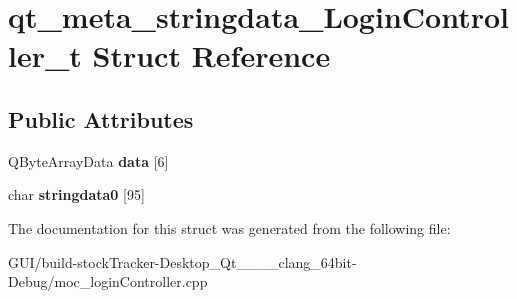 \hypertarget{structqt__meta__stringdata___login_controller__t}{}\section{qt\+\_\+meta\+\_\+stringdata\+\_\+\+Login\+Controller\+\_\+t Struct Reference}
\label{structqt__meta__stringdata___login_controller__t}
\subsection*{Public Attributes}
\begin{DoxyCompactItemize}
\item 
\mbox{\label{structqt__meta__stringdata___login_controller__t_a574003d2fd89e11551bc020bb27b660e}} 
Q\+Byte\+Array\+Data {\bfseries data} \mbox{[}6\mbox{]}
\item 
\mbox{\label{structqt__meta__stringdata___login_controller__t_aa2148a1911add4c4dde96cb5465db0ce}} 
char {\bfseries stringdata0} \mbox{[}95\mbox{]}
\end{DoxyCompactItemize}


The documentation for this struct was generated from the following file\+:\begin{DoxyCompactItemize}
\item 
G\+U\+I/build-\/stock\+Tracker-\/\+Desktop\+\_\+\+Qt\+\_\+\_\+\_\+\_\+clang\+\_\+64bit-\/\+Debug/moc\+\_\+login\+Controller.\+cpp\end{DoxyCompactItemize}

